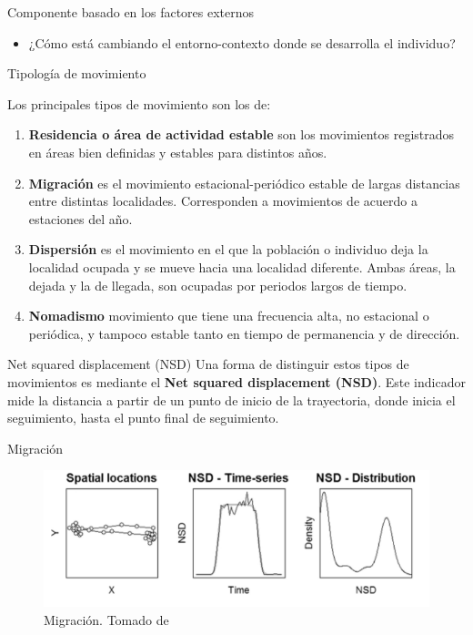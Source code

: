\documentclass[11pt]{beamer}
\begin{document}
\begin{frame}{Componente basado en los factores externos}
	\begin{itemize}
		\item ¿Cómo está cambiando el entorno-contexto donde se desarrolla el individuo?
	\end{itemize}
\end{frame}

\begin{frame}{Tipología de movimiento}

Los principales tipos de movimiento son los de:
	
	\begin{enumerate}
		\item \textbf{Residencia o área de actividad estable} son los movimientos registrados en áreas bien definidas y estables para distintos años. 
		\item \textbf{Migración} es el movimiento estacional-periódico estable de largas distancias entre distintas localidades. Corresponden a movimientos de acuerdo a estaciones del año.
		\item \textbf{Dispersión} es el movimiento en el que la población o individuo deja la localidad ocupada y se mueve hacia una localidad diferente. Ambas áreas, la dejada y la de llegada, son ocupadas por periodos largos de tiempo.
		\item \textbf{Nomadismo} movimiento que tiene una frecuencia alta, no estacional o periódica, y tampoco estable tanto en tiempo de permanencia y de dirección.  
	\end{enumerate}
\end{frame}

\begin{frame}{Net squared displacement (NSD)}
Una forma de distinguir estos tipos de movimientos es mediante el \textbf{Net squared displacement (NSD)}. Este indicador mide la distancia a partir de un punto de inicio de la trayectoria, donde inicia el seguimiento, hasta el punto final de seguimiento.

\end{frame}

\begin{frame}{Migración}
	\begin{figure}
		\includegraphics[scale=0.8]{images/migracion}
		\caption{Migración. Tomado de \cite{bastille2016flexible}}
	\end{figure}
\end{frame}
\end{document}
